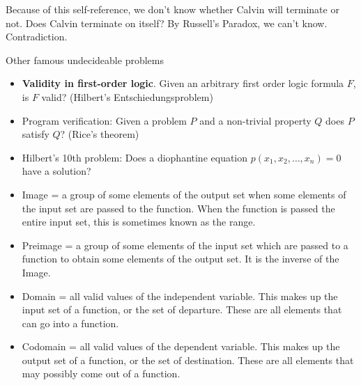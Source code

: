 \documentclass[8pt]{scrreprt}
\begin{document}
\begin{landscape}
\begin{multicols*}{3}
\begin{theorem}
	Because of this self-reference, we don't know whether Calvin will terminate or not.
	Does Calvin terminate on itself? By Russell's Paradox, we can't know. Contradiction.
\end{theorem}

Other famous undecideable problems

\begin{itemize}
	\item \textbf{Validity in first-order logic}. Given an arbitrary first order logic formula
	$F$, is $F$ valid? (Hilbert's Entschiedungsproblem)
	\item Program verification: Given a problem $P$ and a non-trivial property $Q$
	does $P$ satisfy $Q$? (Rice's theorem)
	\item Hilbert's 10th problem: Does a diophantine equation $p(x_1, x_2, \ldots, x_n) = 0$ have a solution?
\end{itemize}

\begin{itemize}
	\item Image = a group of some elements of the output set when some elements of the input set are passed to the function. When the function is passed the entire input set, this is sometimes known as the range.
	\item Preimage = a group of some elements of the input set which are passed to a function to obtain some elements of the output set. It is the inverse of the Image.
	\item Domain = all valid values of the independent variable. This makes up the input set of a function, or the set of departure. These are all elements that can go into a function.  
	\item Codomain = all valid values of the dependent variable. This makes up the output set of a function, or the set of destination. These are all elements that may possibly come out of a function.
\end{itemize}

\end{multicols*}
\end{landscape}
\end{document}
